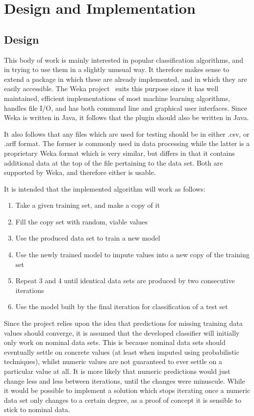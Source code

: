 \newpage
\chapter{Design and Implementation}\label{design_impl}
\section{Design}
\label{design}
This body of work is mainly interested in popular classification algorithms, and in trying to use them in a slightly unusual way. It therefore makes sense to extend a package in which these are already implemented, and in which they are easily accessible. The Weka project~\cite{weka} suits this purpose since it has well maintained, efficient implementations of most machine learning algorithms, handles file I/O, and has both command line and graphical user interfaces. Since Weka is written in Java, it follows that the plugin should also be written in Java.

It also follows that any files which are used for testing should be in either .csv, or .arff format. The former is commonly used in data processing while the latter is a proprietary Weka format which is very similar, but differs in that it contains additional data at the top of the file pertaining to the data set. Both are supported by Weka, and therefore either is usable.

It is intended that the implemented algorithm will work as follows:
\begin{enumerate}
\item Take a given training set, and make a copy of it
\item Fill the copy set with random, viable values
\item Use the produced data set to train a new model
\item Use the newly trained model to impute values into a new copy of the training set
\item Repeat 3 and 4 until identical data sets are produced by two consecutive iterations
\item Use the model built by the final iteration for classification of a test set
\end{enumerate}

Since the project relies upon the idea that predictions for missing training data values should converge, it is assumed that the developed classifier will initially only work on nominal data sets. This is because nominal data sets should eventually settle on concrete values (at least when imputed using probabilistic techniques), whilst numeric values are not guaranteed to ever settle on a particular value at all. It is more likely that numeric predictions would just change less and less between iterations, until the changes were minuscule. While it would be possible to implement a solution which stops iterating once a numeric data set only changes to a certain degree, as a proof of concept it is sensible to stick to nominal data.


